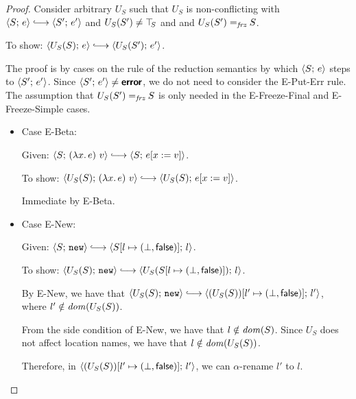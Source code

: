 \begin{proof}
  Consider arbitrary $U_S$ such that $U_S$ is non-conflicting with
  $\config{S}{e} \parstepsto \config{S'}{e'}$ and $U_S(S') \neq \top\hspace{-0.85mm}_{S}$
  and and $U_S(S') =_{\textit{frz}} S$.

  To show: $\config{U_S(S)}{e} \parstepsto \config{U_S(S')}{e'}$.

  The proof is by cases on the rule of the reduction semantics by
  which $\langle S;\, e \rangle$ steps to $\langle S';\, e' \rangle$.  Since
  $\langle S';\, e' \rangle \neq \textbf{\textsf{error}}$, we do not need to consider the {\sc
    E-Put-Err} rule.  The assumption that $U_S(S') =_{\textit{frz}} S$ is
  only needed in the {\sc E-Freeze-Final} and {\sc E-Freeze-Simple}
  cases.

  \begin{itemize}

    \item Case {\sc E-Beta}:

      Given: $\config{S}{\app{(\lam{x}{e})}{v}} \parstepsto
      \config{S}{\subst{e}{x}{v}}$.

      To show: $\config{U_S(S)}{\app{(\lam{x}{e})}{v}} \parstepsto
      \config{U_S(S)}{\subst{e}{x}{v}}$.

      Immediate by {\sc E-Beta}.

    \item Case {\sc E-New}:

      Given: $\config{S}{\NEW} \parstepsto
      \config{\extS{S}{l}{\bot}{\frozenfalse}}{l}$.

      To show: $\config{U_S(S)}{\NEW} \parstepsto
      \config{U_S(\extS{S}{l}{\bot}{\frozenfalse})}{l}$.


      By {\sc E-New}, we have that $\config{U_S(S)}{\NEW} \parstepsto
      \config{\extS{(U_S(S))}{l'}{\bot}{\frozenfalse}}{l'}$, where $l'
      \notin \mathit{dom}(U_S(S))$.

      From the side condition of {\sc E-New}, we have that $l \notin
      \mathit{dom}(S)$.  Since $U_S$ does not affect location names, we have
      that $l \notin \mathit{dom}(U_S(S))$.

      Therefore, in
      $\langle (U_S(S))[l' \mapsto (\bot, \textsf{false})];\, l' \rangle$, we
      can $\alpha$-rename $l'$ to $l$.


\end{itemize}
\end{proof}
